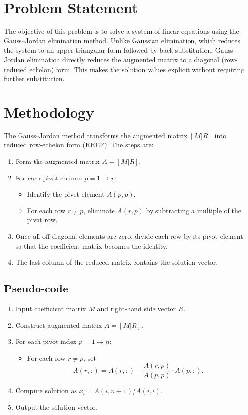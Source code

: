\section*{Problem Statement} 
The objective of this problem is to solve a system of linear equations using the Gauss–Jordan elimination method. Unlike Gaussian elimination, which reduces the system to an upper-triangular form followed by back-substitution, Gauss–Jordan elimination directly reduces the augmented matrix to a diagonal (row-reduced echelon) form. This makes the solution values explicit without requiring further substitution.

\section*{Methodology} 
The Gauss–Jordan method transforms the augmented matrix $[M|R]$ into reduced row-echelon form (RREF). The steps are:

\begin{enumerate}
  \item Form the augmented matrix $A = [M|R]$.
  \item For each pivot column $p = 1 \to n$:
  \begin{itemize}
    \item Identify the pivot element $A(p,p)$.
    \item For each row $r \neq p$, eliminate $A(r,p)$ by subtracting a multiple of the pivot row.
  \end{itemize}
  \item Once all off-diagonal elements are zero, divide each row by its pivot element so that the coefficient matrix becomes the identity.
  \item The last column of the reduced matrix contains the solution vector.
\end{enumerate}

\subsection*{Pseudo-code}
\begin{enumerate}
  \item Input coefficient matrix $M$ and right-hand side vector $R$.
  \item Construct augmented matrix $A = [M|R]$.
  \item For each pivot index $p = 1 \to n$:
  \begin{itemize}
    \item For each row $r \neq p$, set 
    \[
    A(r,:) = A(r,:) - \frac{A(r,p)}{A(p,p)} \cdot A(p,:).
    \]
  \end{itemize}
  \item Compute solution as $x_i = A(i,n+1)/A(i,i)$.
  \item Output the solution vector.
\end{enumerate}

